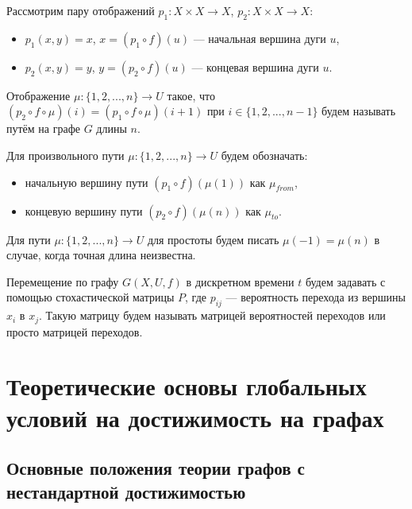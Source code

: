 \begin{definition}
	Рассмотрим пару отображений $p_1:X \times X\to X$, $p_2:X \times X\to X$:
	\begin{itemize}
		\item $p_1(x, y) = x$, $x = (p_1 \circ f)(u)$ --- начальная вершина дуги $u$,
		\item $p_2(x, y) = y$, $y = (p_2 \circ f)(u)$ --- концевая вершина дуги $u$.
	\end{itemize}
\end{definition}

\begin{definition}
	Отображение $\mu:\{1, 2, ... , n\} \to U$ такое, что 
	$(p_2 \circ f \circ \mu)(i) = (p_1 \circ f \circ \mu)(i + 1)$ при $i \in \{1, 2, ... , n-1\}$
	будем называть путём на графе $G$ длины $n$.
\end{definition}

\begin{definition}
	Для произвольного пути $\mu:\{1, 2, ... , n\} \to U$ будем обозначать:
	\begin{itemize}
		\item начальную вершину пути $(p_1 \circ f)(\mu(1))$ как $\mu_{from}$,
		\item концевую вершину пути $(p_2 \circ f)(\mu(n))$ как $\mu_{to}$.
	\end{itemize}
\end{definition}

\begin{definition}
	Для пути $\mu:\{1, 2, ... , n\} \to U$ для простоты будем писать $\mu(-1) = \mu(n)$ в случае, когда точная длина неизвестна. 
\end{definition}

\begin{definition}
	Перемещение по графу $G(X,U,f)$ в дискретном времени $t$ будем задавать с помощью стохастической матрицы $P$, где $p_{ij}$ --- вероятность перехода из вершины $x_i$ в $x_j$.
	Такую матрицу будем называть матрицей вероятностей переходов или просто матрицей переходов.
\end{definition}


\chapter{Теоретические основы глобальных условий на достижимость на графах}

\section{Основные положения теории графов с нестандартной достижимостью}

